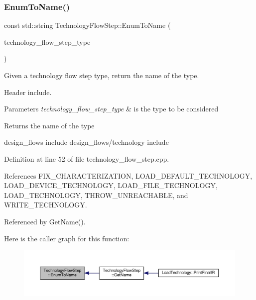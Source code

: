 \subsubsection{\texorpdfstring{Enum\+To\+Name()}{EnumToName()}}
{\footnotesize\ttfamily const std\+::string Technology\+Flow\+Step\+::\+Enum\+To\+Name (\begin{DoxyParamCaption}\item[{const \hyperlink{technology__flow__step_8hpp_a65208cfec963a7d7def292f9db428292}{Technology\+Flow\+Step\+\_\+\+Type}}]{technology\+\_\+flow\+\_\+step\+\_\+type }\end{DoxyParamCaption})\hspace{0.3cm}{\ttfamily [static]}}



Given a technology flow step type, return the name of the type. 

Header include.


\begin{DoxyParams}{Parameters}
{\em technology\+\_\+flow\+\_\+step\+\_\+type} & is the type to be considered \\
\hline
\end{DoxyParams}
\begin{DoxyReturn}{Returns}
the name of the type
\end{DoxyReturn}
design\+\_\+flows include design\+\_\+flows/technology include 

Definition at line 52 of file technology\+\_\+flow\+\_\+step.\+cpp.



References F\+I\+X\+\_\+\+C\+H\+A\+R\+A\+C\+T\+E\+R\+I\+Z\+A\+T\+I\+ON, L\+O\+A\+D\+\_\+\+D\+E\+F\+A\+U\+L\+T\+\_\+\+T\+E\+C\+H\+N\+O\+L\+O\+GY, L\+O\+A\+D\+\_\+\+D\+E\+V\+I\+C\+E\+\_\+\+T\+E\+C\+H\+N\+O\+L\+O\+GY, L\+O\+A\+D\+\_\+\+F\+I\+L\+E\+\_\+\+T\+E\+C\+H\+N\+O\+L\+O\+GY, L\+O\+A\+D\+\_\+\+T\+E\+C\+H\+N\+O\+L\+O\+GY, T\+H\+R\+O\+W\+\_\+\+U\+N\+R\+E\+A\+C\+H\+A\+B\+LE, and W\+R\+I\+T\+E\+\_\+\+T\+E\+C\+H\+N\+O\+L\+O\+GY.



Referenced by Get\+Name().

Here is the caller graph for this function\+:
\nopagebreak
\begin{figure}[H]
\begin{center}
\leavevmode
\includegraphics[width=350pt]{d9/deb/classTechnologyFlowStep_addcc035c454c244798b6d260b35eeae7_icgraph}
\end{center}
\end{figure}
\mbox{\label{classTechnologyFlowStep_ac50a4cc6222e4872c65c93f55415c3b7}} 

